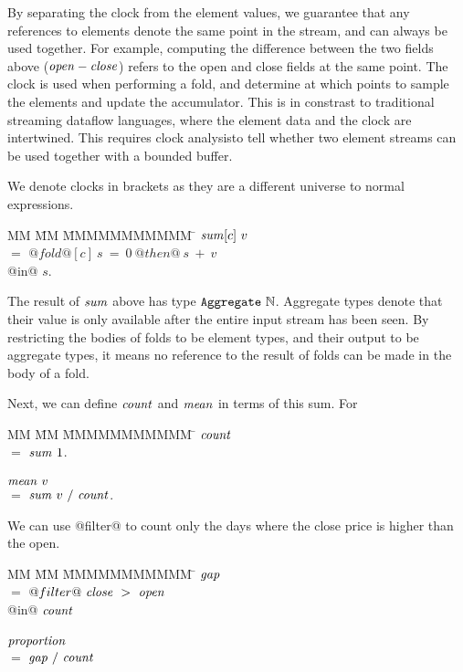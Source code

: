 By separating the clock from the element values, we guarantee that any references to elements denote the same point in the stream, and can always be used together.
For example, computing the difference between the two fields above ($\mathit{open} - \mathit{close}$) refers to the open and close fields at the same point.
The clock is used when performing a fold, and determine at which points to sample the elements and update the accumulator.
This is in constrast to traditional streaming dataflow languages, where the element data and the clock are intertwined.
This requires clock analysis\CITE to tell whether two element streams can be used together with a bounded buffer.

We denote clocks in brackets as they are a different universe to normal expressions.
\begin{tabbing}
MM \= MM \= MMMMMMMMMMM \= \kill
$\mathit{sum}[c]~v$    \\
\> $=$  \> $@fold@[c]~s~=~0~@then@~s~+~v$ \\
\> @in@ \> $s$. \\
\end{tabbing}

The result of $\mathit{sum}$ above has type $\mathtt{Aggregate}~\mathbb{N}$.
Aggregate types denote that their value is only available after the entire input stream has been seen.
By restricting the bodies of folds to be element types, and their output to be aggregate types, it means no reference to the result of folds can be made in the body of a fold.


Next, we can define $\mathit{count}$ and $\mathit{mean}$ in terms of this sum.
For 
\begin{tabbing}
MM \= MM \= MMMMMMMMMMM \= \kill
$\mathit{count}$                                        \\
 \> $=$  \> $\mathit{sum}~1$.                           \\
                                                    \\
$\mathit{mean}~v$                                       \\
 \> $=$  \> $\mathit{sum}~v~/~\mathit{count}$.              \\
\end{tabbing}

We can use @filter@ to count only the days where the close price is higher than the open.
\begin{tabbing}
MM \= MM \= MMMMMMMMMMM \= \kill
$\mathit{gap}$                                          \\
 \> $=$  \> $@filter@~\mathit{close}~>~\mathit{open}$       \\
 \> @in@ \> $\mathit{count}$                            \\
                                                    \\
$\mathit{proportion}$                                   \\
 \> $=$  \> $\mathit{gap}~/~\mathit{count}$
\end{tabbing}


